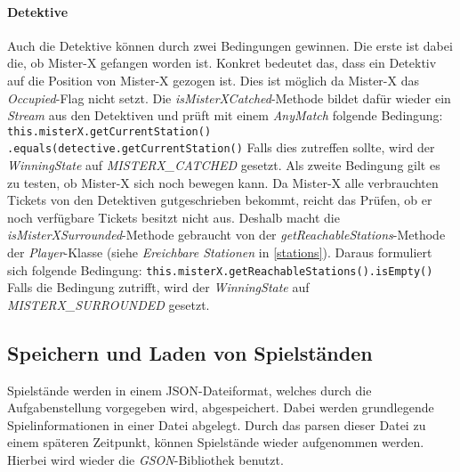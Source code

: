                 \paragraph{Detektive}
                    Auch die Detektive können durch zwei Bedingungen gewinnen.
                    Die erste ist dabei die, ob Mister-X gefangen worden ist.
                    Konkret bedeutet das, dass ein Detektiv auf die Position von Mister-X gezogen ist.
                    Dies ist möglich da Mister-X das \textit{Occupied}-Flag nicht setzt.
                    Die \textit{isMisterXCatched}-Methode bildet dafür wieder ein \textit{Stream} aus den Detektiven
                    und prüft mit einem \textit{AnyMatch} folgende Bedingung:
                    \newline
                    \newline
                    \texttt{this.misterX.getCurrentStation()\\.equals(detective.getCurrentStation()}
                    \newline
                    \newline
                    Falls dies zutreffen sollte, wird der \textit{WinningState} auf \textit{MISTERX\_CATCHED} gesetzt.
                    Als zweite Bedingung gilt es zu testen, ob Mister-X sich noch bewegen kann.
                    Da Mister-X alle verbrauchten Tickets von den Detektiven gutgeschrieben bekommt, reicht das Prüfen, ob 
                    er noch verfügbare Tickets besitzt nicht aus.
                    Deshalb macht die \textit{isMisterXSurrounded}-Methode gebraucht von der \textit{getReachableStations}-Methode
                    der \textit{Player}-Klasse (siehe \textit{Ereichbare Stationen} in \ref{stations}).
                    Daraus formuliert sich folgende Bedingung:
                    \newline
                    \newline
                    \texttt{this.misterX.getReachableStations().isEmpty()}
                    \newline
                    \newline
                    Falls die Bedingung zutrifft, wird der \textit{WinningState} auf \textit{MISTERX\_SURROUNDED} gesetzt.

        \subsection{Speichern und Laden von Spielständen}
            Spielstände werden in einem JSON-Dateiformat, welches durch die Aufgabenstellung vorgegeben wird, abgespeichert.
            Dabei werden grundlegende Spielinformationen in einer Datei abgelegt. Durch das parsen dieser Datei zu einem späteren Zeitpunkt, können
            Spielstände wieder aufgenommen werden. Hierbei wird wieder die \textit{GSON}-Bibliothek benutzt.


